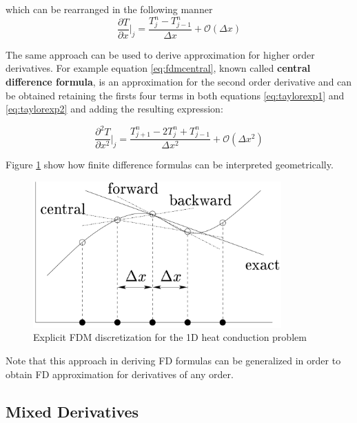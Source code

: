     which can be rearranged in the following manner
        \begin{equation}
    \frac{\partial T}{\partial x}\bigg\rvert_j  = \frac{T^n_{j} - T^n_{j-1}}{\Delta x} + \mathcal{O}(\Delta x)
    \label{eq:fdmfbackward}
    \end{equation}
    
   The same approach can be used to derive approximation for higher order derivatives.
   For example equation \ref{eq:fdmcentral}, known called \textbf{central difference formula}, is an approximation for the second order derivative and can be obtained retaining the firsts four terms in both equations \ref{eq:taylorexp1} and \ref{eq:taylorexp2} and adding the resulting expression:
   
    \begin{equation}
		\frac{\partial^2 T}{\partial x^2}\bigg\rvert_j = \frac{T^n_{j+1}- 2T^n_{j} + T^n_{j-1}}{\Delta x^2} + \mathcal{O}(\Delta x^2)
		\label{eq:fdmcentral}
    \end{equation}
    
    Figure \ref{fig:geometrical_intepretation} show how finite difference formulas can be interpreted geometrically.
\begin{figure}
	\centering
	\includegraphics[width=0.85\textwidth]{./images/CA_FDM/geometrical_interpretation_fd}
	\caption{Explicit FDM discretization for the 1D heat conduction problem}
	\label{fig:geometrical_intepretation}
\end{figure} 
    
Note that this approach in deriving FD formulas can be generalized in order to obtain FD approximation for derivatives of any order.

 \subsection{Mixed Derivatives}

